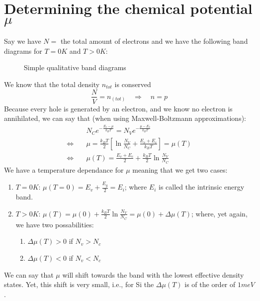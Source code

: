 \section{Determining the chemical potential $\mu$}
Say we have $N = $ the total amount of electrons and we have the following band diagrams for $T = 0K$ and $T > 0K$:
\begin{figure}
	\centering
	\begin{tikzpicture}

	\end{tikzpicture}
	\caption{Simple qualitative band diagrams}
	\label{fig:determining_mu}
\end{figure}
We know that the total density $n_{tot}$ is conserved
\begin{equation}
	\frac{N}{V} = n_(tot) \quad \Rightarrow \quad n = p
\end{equation}
Because every hole is generated by an electron, and we know no electron is annihilated, we can say that (when using Maxwell-Boltzmann approximations):
\begin{align}
	&N_Ce^{-\frac{E_c - \mu}{k_BT}} = N_Ve^{-\frac{\mu - E_v}{k_BT}} \\
	\iff\quad&\mu = \frac{k_BT}{2}\left[\ln\frac{N_V}{N_C} + \frac{E_v + E_c}{k_BT}\right] = \mu(T) \\
	\iff\quad&\mu(T) = \frac{E_v + E_c}{2} + \frac{k_BT}{2}\ln\frac{N_V}{N_C}
\end{align}
We have a temperature dependance for $\mu$ meaning that we get two cases:
\begin{enumerate}
	\item $T = 0K$: $\mu(T = 0) = E_v + \frac{E_g}{2} = E_i$; \qquad  where $E_i$ is called the intrinsic energy band.
	\item $T > 0K$: $\mu(T) = \mu(0) + \frac{k_BT}{2}\ln\frac{N_V}{N_C} = \mu(0) + \Delta\mu(T)$; \qquad where, yet again, we have two possabilities:
	\begin{enumerate}
		\setlength\itemsep{0pt}
		\item $\Delta\mu(T) > 0$ if $N_v > N_c$
		\item $\Delta\mu(T) < 0$ if $N_v < N_c$
	\end{enumerate}
\end{enumerate}
We can say that $\mu$ will shift towards the band with the lowest effective density states. Yet, this shift is very small, i.e., for Si the $\Delta\mu(T)$ is of the order of $1meV$.
